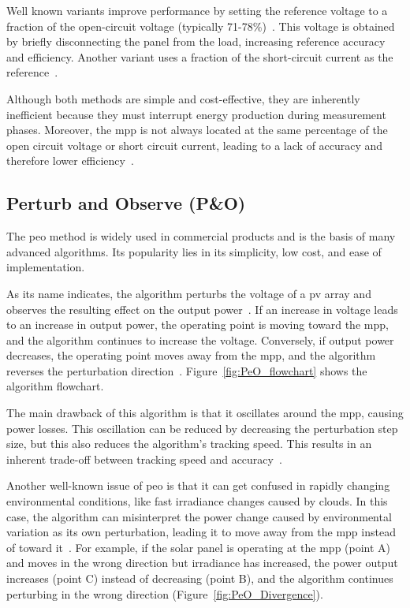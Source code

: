          Well known variants improve performance by setting the reference voltage to a fraction of the open-circuit voltage (typically 71-78\%)~\cite{Comparison_PV_Array_MPPT_Techniques_2007}. This voltage is obtained by briefly disconnecting the panel from the load, increasing reference accuracy and efficiency. Another variant uses a fraction of the short-circuit current as the reference~\cite{MPPT_Comparison_techniques}.
         

        Although both methods are simple and cost-effective, they are inherently inefficient because they must interrupt energy production during measurement phases. Moreover, the \ac{mpp} is not always located at the same percentage of the open circuit voltage or short circuit current, leading to a lack of accuracy and therefore lower efficiency~\cite{Comparative_study_MPPT_algorithms_2000}.


    \subsection{Perturb and Observe (P\&O)}
        The \ac{peo} method is widely used in commercial products and is the basis of many advanced algorithms. Its popularity lies in its simplicity, low cost, and ease of implementation.

        As its name indicates, the algorithm perturbs the voltage of a \acs{pv} array and observes the resulting effect on the output power~\cite{chermitti2012improvement}. If an increase in voltage leads to an increase in output power, the operating point is moving toward the \ac{mpp}, and the algorithm continues to increase the voltage. Conversely, if output power decreases, the operating point moves away from the \ac{mpp}, and the algorithm reverses the perturbation direction~\cite {PeO_and_Newton_Raphson_Comparison,Look-Up-Table_VS_PeO}. Figure~\ref{fig:PeO_flowchart} shows the algorithm flowchart.
                

        The main drawback of this algorithm is that it oscillates around the \ac{mpp}, causing power losses. This oscillation can be reduced by decreasing the perturbation step size, but this also reduces the algorithm's tracking speed. This results in an inherent trade-off between tracking speed and accuracy~\cite{MPPT_Comparison_techniques,Comparison_PV_Array_MPPT_Techniques_2007}.

        Another well-known issue of \ac{peo} is that it can get confused in rapidly changing environmental conditions, like fast irradiance changes caused by clouds. In this case, the algorithm can misinterpret the power change caused by environmental variation as its own perturbation, leading it to move away from the \ac{mpp} instead of toward it~\cite{Comparison_PV_Array_MPPT_Techniques_2007}. For example, if the solar panel is operating at the \ac{mpp} (point A) and moves in the wrong direction but irradiance has increased, the power output increases (point C) instead of decreasing (point B), and the algorithm continues perturbing in the wrong direction (Figure~\ref{fig:PeO_Divergence}).


